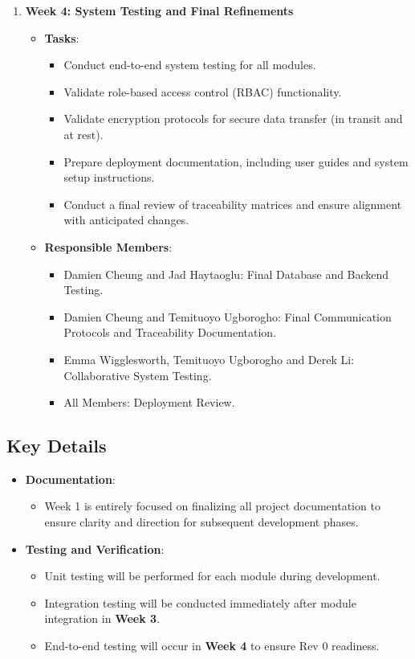 \documentclass[12pt, titlepage]{article}
\begin{document}
\begin{enumerate}
    \item \textbf{Week 4: System Testing and Final Refinements}
    \begin{itemize}
        \item \textbf{Tasks}:
        \begin{itemize}
            \item Conduct end-to-end system testing for all modules.
            \item Validate role-based access control (RBAC) functionality.
            \item Validate encryption protocols for secure data transfer (in transit and at rest).
            \item Prepare deployment documentation, including user guides and system setup instructions.
            \item Conduct a final review of traceability matrices and ensure alignment with anticipated changes.
        \end{itemize}
        \item \textbf{Responsible Members}:
        \begin{itemize}
            \item Damien Cheung and Jad Haytaoglu: Final Database and Backend Testing.
            \item Damien Cheung and Temituoyo Ugborogho: Final Communication Protocols and Traceability Documentation.
            \item Emma Wigglesworth, Temituoyo Ugborogho and Derek Li: Collaborative System Testing.
            \item All Members: Deployment Review.
        \end{itemize}
    \end{itemize}
\end{enumerate}

\subsection*{Key Details}
\begin{itemize}
    \item \textbf{Documentation}:
    \begin{itemize}
        \item Week 1 is entirely focused on finalizing all project documentation to ensure clarity and direction for subsequent development phases.
    \end{itemize}
    \item \textbf{Testing and Verification}:
    \begin{itemize}
        \item Unit testing will be performed for each module during development.
        \item Integration testing will be conducted immediately after module integration in \textbf{Week 3}.
        \item End-to-end testing will occur in \textbf{Week 4} to ensure Rev 0 readiness.
    \end{itemize}
\end{itemize}
\end{document}
